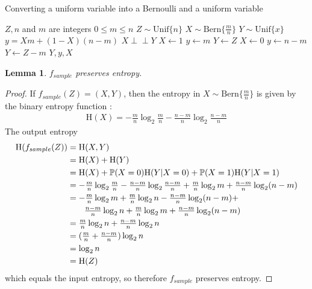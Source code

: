 \documentclass[12pt]{article}
\newtheorem{lemma}{Lemma}
\newcommand{\indep}{\perp\!\!\!\perp}
\newcommand{\unif}[1]{\mathrm{Unif}\{#1\}}
\newcommand{\bern}[1]{\mathrm{Bern}\{#1\}}
\newcommand{\entropy}[1]{\mathrm{H}(#1)}
\newcommand{\prob}[1]{\mathbb{P}(#1)}
\begin{document}
\begin{algorithm}
\caption{Converting a uniform variable into a Bernoulli and a uniform variable}
\label{alg:sample}
\begin{algorithmic}[1]
    \Require $Z, n$ and $m$ are integers 
    \Require $0 \le m \le n$
    \Require $Z \sim \unif{n}$
    \Ensure $X \sim \bern{\frac{m}{n}}$
    \Ensure $Y \sim \unif{x}$
    \Ensure $y = Xm + (1-X)(n-m)$
    \Ensure $X \indep Y$
    \State $X \gets 1$  
    \State $y \gets m$
    \State $Y \gets Z$
  \Else
    \State $X \gets 0$  
    \State $y \gets n-m$
    \State $Y \gets Z-m$
  \EndIf
  \State \Return $Y, y, X$
\EndProcedure
\end{algorithmic}
\end{algorithm}

\begin{lemma}
    $f_{sample}$ preserves entropy.
    \label{lem:sample-entropy}
\end{lemma}

\begin{proof}If $f_{sample}(Z) = (X,Y)$, then the entropy in $X \sim \bern{\frac{m}{n}}$ is given by the binary entropy function \cite{cover1999elements}:
    \begin{align}
    \entropy{X} = -\tfrac{m}{n}\log_2\tfrac{m}{n} - \tfrac{n-m}{n}\log_2\tfrac{n-m}{n}
    \end{align}
    The output entropy
    \begin{align}
    \entropy{f_{sample}(Z)}  &= \entropy{X,Y} \\
                    &= \entropy{X} + \entropy{Y} \\
                    &= \entropy{X} + \prob{X=0}\entropy{Y|X=0} + \prob{X=1}\entropy{Y|X=1} \\
                    &= -\tfrac{m}{n}\log_2\tfrac{m}{n} - \tfrac{n-m}{n}\log_2\tfrac{n-m}{n} + \tfrac{m}{n}\log_2{m} + \tfrac{n-m}{n}\log_2(n-m) \\
                    &= -\tfrac{m}{n}\log_2m + \tfrac{m}{n}\log_2n - \tfrac{n-m}{n}\log_2(n-m) + \notag \\
                    &\quad\quad   \tfrac{n-m}{n}\log_2{n} + \tfrac{m}{n}\log_2{m} + \tfrac{n-m}{n}\log_2(n-m) \\
                    &= \tfrac{m}{n}\log_2n + \tfrac{n-m}{n}\log_2n \\
                    &= (\tfrac{m}{n} + \tfrac{n-m}{n})\log_2n \\
                    &= \log_2n \\
                    &= \entropy{Z}
    \end{align}
    which equals the input entropy, so therefore $f_{sample}$ preserves entropy.
\end{proof}
\end{document}
